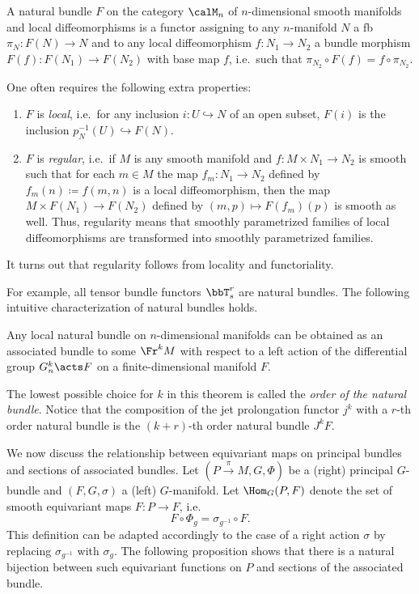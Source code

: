 \begin{defn}\label{def natural bundle}
    A natural bundle $F$ on the category $\calM_n$ of $n$-dimensional smooth manifolds and local diffeomorphisms is a functor assigning to any $n$-manifold $N$ a \gls{fb} $\pi_N:F(N)\to N$ and to any local diffeomorphism $f:N_1\to N_2$ a bundle morphism $F(f):F(N_1)\to F(N_2)$ with base map $f$, i.e.\ such that $\pi_{N_2}\circ F(f)=f\circ \pi_{N_2}$. 

    One often requires the following extra properties:
    \begin{enumerate}[label=(\alph*)]
        \item $F$ is \emph{local}, i.e.\ for any inclusion $i:U\hookrightarrow N$ of an open subset, $F(i)$ is the inclusion $p^{-1}_N(U)\hookrightarrow F(N)$.
    
        \item $F$ is \emph{regular}, i.e.\ if $M$ is any smooth manifold and $f:M\times N_1\to N_2$ is smooth such that for each $m\in M$ the map $f_m:N_1\to N_2$ defined by $f_m(n)\coloneqq f(m,n)$ is a local diffeomorphism, then the map $M\times F(N_1)\to F(N_2)$ defined by $(m,p)\mapsto F(f_m)(p)$ is smooth as well. Thus, regularity means that smoothly parametrized families of local diffeomorphisms are transformed into smoothly parametrized families.
    \end{enumerate}
    It turns out that regularity follows from locality and functoriality.
\end{defn}

For example, all tensor bundle functors $\bbT^r_s$ are natural bundles. The following intuitive characterization of natural bundles holds.

\begin{thm}
    Any local natural bundle on $n$-dimensional manifolds can be obtained as an associated bundle to some $\Fr^k M$ with respect to a left action of the differential group $G^k_n\acts F$ on a finite-dimensional manifold $F$.
\end{thm}

The lowest possible choice for $k$ in this theorem is called the \emph{order of the natural bundle}. Notice that the composition of the jet prolongation functor $j^k$ with a $r$-th order natural bundle is the $(k+r)$-th order natural bundle $J^k F$.




We now discuss the relationship between equivariant maps on principal bundles and sections of associated bundles. Let $(P\overset{\pi}{\to}M,G,\Phi)$ be a (right) principal $G$-bundle and $(F,G,\sigma)$ a (left) $G$-manifold. Let $\Hom_G(P,F)$ denote the set of smooth equivariant maps $F:P\to F$, i.e.
\[F\circ \Phi_g=\sigma_{g^{-1}}\circ F.\label{eq 1.2.9 RS2}\]
This definition can be adapted accordingly to the case of a right action $\sigma$ by replacing $\sigma_{g^{-1}}$ with $\sigma_g$. The following proposition shows that there is a natural bijection between such equivariant functions on $P$ and sections of the associated bundle.

